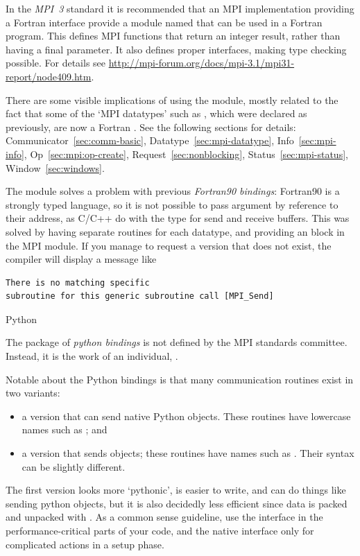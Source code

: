%
In the \emph{MPI~3}%
 standard it is recommended that
an MPI implementation providing a Fortran interface provide a
module named  that can be used in a Fortran program.
This defines MPI functions that return an integer result, rather than
having a final parameter. It also defines proper interfaces, making
type checking possible.
%
For details see
\url{http://mpi-forum.org/docs/mpi-3.1/mpi31-report/node409.htm}.

There are some visible implications of using the  module,
mostly related to the fact that some of the `MPI datatypes' such as
, which were declared as 
previously, are now a Fortran .
See the following sections for details:
Communicator~\ref{sec:comm-basic}, Datatype~\ref{sec:mpi-datatype},
Info~\ref{sec:mpi-info}, Op~\ref{sec:mpi:op-create},
Request~\ref{sec:nonblocking}, Status~\ref{sec:mpi-status},
Window~\ref{sec:windows}.

The  module solves a problem with previous
\emph{Fortran90 bindings}:
%
Fortran90 is a strongly typed language, so it is not possible to pass
argument by reference to their address, as C/C++ do with the 
type for send and receive buffers. This was solved by having
separate routines for each datatype, and providing an  block
in the MPI module. If you manage to request a version that does not exist,
the compiler will display a message like
\begin{verbatim}
There is no matching specific 
subroutine for this generic subroutine call [MPI_Send]
\end{verbatim}



 {Python}
\label{sec:python-bind}

The  package of \emph{python bindings}
is not defined by the MPI
standards committee. Instead, it is the work of an individual,
.

Notable about the Python bindings is that many communication routines
exist in two variants:
\begin{itemize}
\item a version that can send native Python objects. These routines
  have lowercase names such as ; and
\item a version that sends  objects; these routines
  have names such as . Their syntax can be slightly different.
\end{itemize}
The first version looks more `pythonic', is easier to write,
and can do things like sending python objects,
but it is also decidedly less efficient since data is packed
and unpacked with . As a common sense guideline,
use the  interface in the performance-critical parts
of your code, and the native interface only for complicated
actions in a setup phase.

